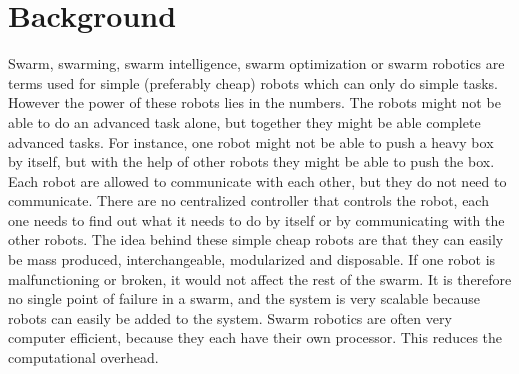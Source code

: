 \section{Background}
Swarm, swarming, swarm intelligence, swarm optimization or swarm robotics are terms used for simple (preferably cheap) robots which can only do simple tasks. However the power of these robots lies in the numbers. The robots might not be able to do an advanced task alone, but together they might be able complete advanced tasks. For instance, one robot might not be able to push a heavy box by itself, but with the help of other robots they might be able to push the box.
Each robot are allowed to communicate with each other, but they do not need to communicate. There are no centralized controller that controls the robot, each one needs to find out what it needs to do by itself or by communicating with the other robots. The idea behind these simple cheap robots are that they can easily be mass produced, interchangeable, modularized and disposable. If one robot is malfunctioning or broken, it would not affect the rest of the swarm. It is therefore no single point of failure in a swarm, and the system is very scalable because robots can easily be added to the system.
Swarm robotics are often very computer efficient, because they each have their own processor. This reduces the computational overhead. 

